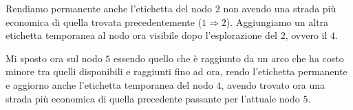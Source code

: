 \documentclass{article}
\begin{document}
\begin{center}
\end{center}

Rendiamo permanente anche l'etichetta del nodo 2 non avendo una strada più economica di quella trovata precedentemente ($1 \Rightarrow 2$).
Aggiungiamo un altra etichetta temporanea al nodo ora visibile dopo l'esplorazione del $2$, ovvero il $4$.\\

\begin{center}
\end{center}

Mi sposto ora sul nodo $5$ essendo quello che è raggiunto da un arco che ha costo minore tra quelli disponibili e raggiunti fino ad ora, rendo l'etichetta permanente e aggiorno anche l'etichetta temporanea del nodo $4$, avendo trovato ora una strada più economica di quella precedente passante per l'attuale nodo $5$.

\begin{center}
\end{center}
\end{document}
